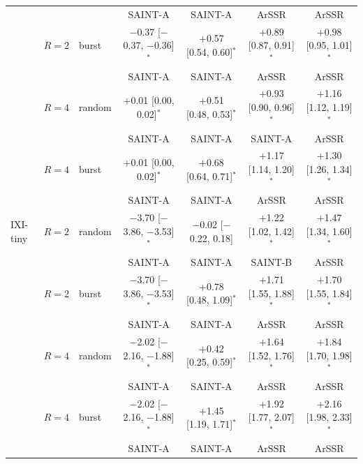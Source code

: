 \begin{table}[pos=t]
\begin{tabular*}{\textwidth}{@{\extracolsep{\fill}}lllcccc@{}}
 & & & {\scriptsize\color{black!60}SAINT-A} & {\scriptsize\color{black!60}SAINT-A} & {\scriptsize\color{black!60}ArSSR} & {\scriptsize\color{black!60}ArSSR} \\[1pt]
 & $R=2$ & burst & $-$0.37 [$-$0.37, $-$0.36]$^{\ast}$ & $+$0.57 [0.54, 0.60]$^{\ast}$ & $+$0.89 [0.87, 0.91]$^{\ast}$ & $+$0.98 [0.95, 1.01]$^{\ast}$ \\
 & & & {\scriptsize\color{black!60}SAINT-A} & {\scriptsize\color{black!60}SAINT-A} & {\scriptsize\color{black!60}ArSSR} & {\scriptsize\color{black!60}ArSSR} \\[1pt]
 & $R=4$ & random & $+$0.01 [0.00, 0.02]$^{\ast}$ & $+$0.51 [0.48, 0.53]$^{\ast}$ & $+$0.93 [0.90, 0.96]$^{\ast}$ & $+$1.16 [1.12, 1.19]$^{\ast}$ \\
 & & & {\scriptsize\color{black!60}SAINT-A} & {\scriptsize\color{black!60}SAINT-A} & {\scriptsize\color{black!60}SAINT-A} & {\scriptsize\color{black!60}ArSSR} \\[1pt]
 & $R=4$ & burst & $+$0.01 [0.00, 0.02]$^{\ast}$ & $+$0.68 [0.64, 0.71]$^{\ast}$ & $+$1.17 [1.14, 1.20]$^{\ast}$ & $+$1.30 [1.26, 1.34]$^{\ast}$ \\
 & & & {\scriptsize\color{black!60}SAINT-A} & {\scriptsize\color{black!60}SAINT-A} & {\scriptsize\color{black!60}ArSSR} & {\scriptsize\color{black!60}ArSSR} \\[1pt]
\midrule
IXI-tiny & $R=2$ & random & $-$3.70 [$-$3.86, $-$3.53]$^{\ast}$ & $-$0.02 [$-$0.22, 0.18] & $+$1.22 [1.02, 1.42]$^{\ast}$ & $+$1.47 [1.34, 1.60]$^{\ast}$ \\
 & & & {\scriptsize\color{black!60}SAINT-A} & {\scriptsize\color{black!60}SAINT-A} & {\scriptsize\color{black!60}SAINT-B} & {\scriptsize\color{black!60}ArSSR} \\[1pt]
 & $R=2$ & burst & $-$3.70 [$-$3.86, $-$3.53]$^{\ast}$ & $+$0.78 [0.48, 1.09]$^{\ast}$ & $+$1.71 [1.55, 1.88]$^{\ast}$ & $+$1.70 [1.55, 1.84]$^{\ast}$ \\
 & & & {\scriptsize\color{black!60}SAINT-A} & {\scriptsize\color{black!60}SAINT-A} & {\scriptsize\color{black!60}ArSSR} & {\scriptsize\color{black!60}ArSSR} \\[1pt]
 & $R=4$ & random & $-$2.02 [$-$2.16, $-$1.88]$^{\ast}$ & $+$0.42 [0.25, 0.59]$^{\ast}$ & $+$1.64 [1.52, 1.76]$^{\ast}$ & $+$1.84 [1.70, 1.98]$^{\ast}$ \\
 & & & {\scriptsize\color{black!60}SAINT-A} & {\scriptsize\color{black!60}SAINT-A} & {\scriptsize\color{black!60}ArSSR} & {\scriptsize\color{black!60}ArSSR} \\[1pt]
 & $R=4$ & burst & $-$2.02 [$-$2.16, $-$1.88]$^{\ast}$ & $+$1.45 [1.19, 1.71]$^{\ast}$ & $+$1.92 [1.77, 2.07]$^{\ast}$ & $+$2.16 [1.98, 2.33]$^{\ast}$ \\
 & & & {\scriptsize\color{black!60}SAINT-A} & {\scriptsize\color{black!60}SAINT-A} & {\scriptsize\color{black!60}ArSSR} & {\scriptsize\color{black!60}ArSSR} \\[1pt]
\bottomrule
\end{tabular*}
\end{table}
